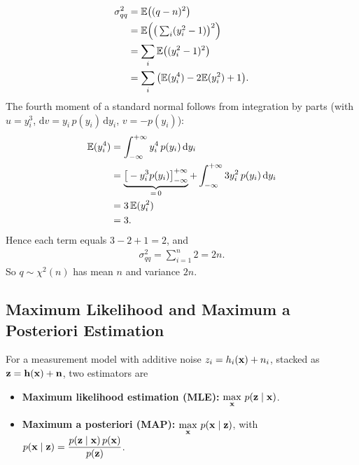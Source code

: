 \begin{align}
\sigma_{qq}^2 &= \mathbb{E}\big((q - n)^2\big) \\
&= \mathbb{E}\Big(\big(\textstyle\sum_i (y_i^2-1)\big)^2\Big) \\
&= \sum_i \mathbb{E}\big((y_i^2-1)^2\big) \\
&= \sum_i \big(\mathbb{E}(y_i^4) - 2\mathbb{E}(y_i^2) + 1\big).
\end{align}
The fourth moment of a standard normal follows from integration by parts (with $u=y_i^3$, $\mathrm{d}v = y_i\,p(y_i)\,\mathrm{d}y_i$, $v=-p(y_i)$):
\begin{align}
\mathbb{E}(y_i^4) &= \int_{-\infty}^{+\infty} y_i^4\, p(y_i)\,\mathrm{d}y_i \\
&= \underbrace{\big[-y_i^3 p(y_i)\big]_{-\infty}^{+\infty}}_{=\,0}
+ \int_{-\infty}^{+\infty} 3 y_i^2\, p(y_i)\,\mathrm{d}y_i \\
&= 3\,\mathbb{E}(y_i^2) \\
&= 3.
\end{align}
Hence each term equals $3 - 2 + 1 = 2$, and
\begin{align}
\sigma_{qq}^2 = \sum_{i=1}^n 2 = 2n.
\end{align}
So $q\sim\chi^2(n)$ has mean $n$ and variance $2n$.

\subsection{Maximum Likelihood and Maximum a Posteriori Estimation}

For a measurement model with additive noise $z_i = h_i(\boldsymbol{\mathbf{x}}) + n_i$, stacked as $\boldsymbol{\mathbf{z}} = \boldsymbol{\mathbf{h}}(\boldsymbol{\mathbf{x}}) + \boldsymbol{\mathbf{n}}$, two estimators are
\begin{itemize}[itemsep=0.3em]
\item \textbf{Maximum likelihood estimation (MLE):} $\displaystyle \max_{\boldsymbol{\mathbf{x}}}\, p(\boldsymbol{\mathbf{z}}\mid\boldsymbol{\mathbf{x}})$.
\item \textbf{Maximum a posteriori (MAP):} $\displaystyle \max_{\boldsymbol{\mathbf{x}}}\, p(\boldsymbol{\mathbf{x}}\mid\boldsymbol{\mathbf{z}})$, with $p(\boldsymbol{\mathbf{x}}\mid\boldsymbol{\mathbf{z}}) = \dfrac{p(\boldsymbol{\mathbf{z}}\mid\boldsymbol{\mathbf{x}})\,p(\boldsymbol{\mathbf{x}})}{p(\boldsymbol{\mathbf{z}})}$.
\end{itemize}

